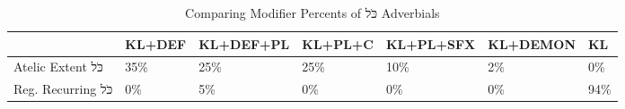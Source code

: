 \begin{table}[htbp!]
\centering
\caption{Comparing Modifier Percents of כֹּל Adverbials}
\label{table:kl_cf_pc}
\begin{adjustbox}{width=1\textwidth}
\begin{tabular}{lllllll}
\toprule
{} & KL+DEF & KL+DEF+PL & KL+PL+C & KL+PL+SFX & KL+DEMON &   KL \\
\midrule
Atelic Extent כֹּל  &    35\% &       25\% &     25\% &       10\% &       2\% &   0\% \\
Reg. Recurring כֹּל &     0\% &        5\% &      0\% &        0\% &       0\% &  94\% \\
\bottomrule
\end{tabular}
\end{adjustbox}
\end{table}
